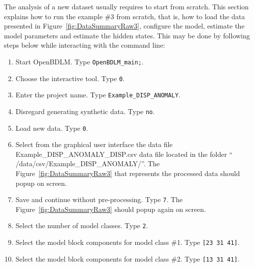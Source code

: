 The analysis of a new dataset usually requires to start from scratch.
This section explains how to run the example \#3 from scratch, that is, how to load the data presented in Figure~\ref{fig:DataSummaryRaw3}, configure the model, estimate the model parameters and estimate the hidden states.
This may be done by following steps below while interacting with the \MATLAB{} command line:
\begin{enumerate}
\item Start OpenBDLM. Type \colorbox{light-gray}{\lstinline[basicstyle = \mlttfamily \small, backgroundcolor = \color{light-gray}]!OpenBDLM_main;!}.
\item Choose the interactive tool. Type \colorbox{light-gray}{\lstinline[basicstyle = \mlttfamily \small, backgroundcolor = \color{light-gray}]!0!}.
\item Enter the project name. Type \colorbox{light-gray}{\lstinline[basicstyle = \mlttfamily \small, backgroundcolor = \color{light-gray}]!Example_DISP_ANOMALY!}. 
\item Disregard generating synthetic data. Type \colorbox{light-gray}{\lstinline[basicstyle = \mlttfamily \small, backgroundcolor = \color{light-gray}]!no!}. 
\item Load new data. Type \colorbox{light-gray}{\lstinline[basicstyle = \mlttfamily \small, backgroundcolor = \color{light-gray}]!0!}.
\item Select from the graphical user interface the data file Example\_DISP\_ANOMALY\_DISP.csv data file located in the folder `` /data/csv/Example\_DISP\_ANOMALY/''. The Figure~\ref{fig:DataSummaryRaw3} that represents the processed data should popup on screen.
\item Save and continue without pre-processing. Type \colorbox{light-gray}{\lstinline[basicstyle = \mlttfamily \small, backgroundcolor = \color{light-gray}]!7!}. The Figure~\ref{fig:DataSummaryRaw3} should popup again on screen.
\item Select the number of model classes. Type \colorbox{light-gray}{\lstinline[basicstyle = \mlttfamily \small, backgroundcolor = \color{light-gray}]!2!}. 
\item Select the model block components for model class \#1. Type \colorbox{light-gray}{\lstinline[basicstyle = \mlttfamily \small, backgroundcolor = \color{light-gray}]![23 31 41]!}.
\item Select the model block components for model class \#2. Type \colorbox{light-gray}{\lstinline[basicstyle = \mlttfamily \small, backgroundcolor = \color{light-gray}]![13 31 41]!}.

\end{enumerate}
